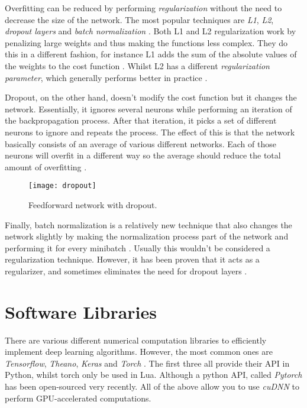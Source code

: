 \newpage

Overfitting can be reduced by performing \textit{regularization} without the need to decrease the size of the network.
The most popular techniques are \textit{L1}, \textit{L2}, \textit{dropout layers} and \textit{batch normalization} \cite{nielsen_2017}.
Both L1 and L2 regularization work by penalizing large weights and thus making the functions less complex.
They do this in a different fashion, for instance L1 adds the sum of the absolute values of the weights to the cost function \cite{nielsen_2017}.
Whilst L2 has a different \textit{regularization parameter}, which generally performs better in practice \cite{nielsen_2017}.

Dropout, on the other hand, doesn't modify the cost function but it changes the network.
Essentially, it ignores several neurons while performing an iteration of the backpropagation process.
After that iteration, it picks a set of different neurons to ignore and repeats the process.
The effect of this is that the network basically consists of an average of various different networks.
Each of those neurons will overfit in a different way so the average should reduce the total amount of overfitting \cite{nielsen_2017}.

\begin{figure}[ht]
  \centering
  \texttt{[image: dropout]}
  \caption{Feedforward network with dropout.}
  \label{fig:dropout}
\end{figure}


Finally, batch normalization is a relatively new technique that also changes the network slightly by making the normalization process part of the network and performing it for every minibatch \cite{ioffe2015batch}.
Usually this wouldn't be considered a regularization technique.
However, it has been proven that it acts as a regularizer, and sometimes eliminates the need for dropout layers \cite{ioffe2015batch}.

\newpage

\section{Software Libraries}

There are various different numerical computation libraries to efficiently implement deep learning algorithms.
However, the most common ones are \textit{Tensorflow}, \textit{Theano}, \textit{Keras} and \textit{Torch} \cite{tensorflow,theano,keras,torch}.
The first three all provide their API in Python, whilst torch only be used in Lua.
Although a python API, called \textit{Pytorch} has been open-sourced very recently.
All of the above allow you to use \textit{cuDNN} to perform GPU-accelerated computations.

